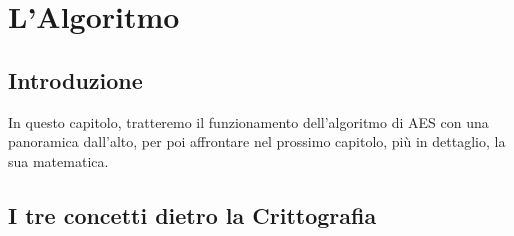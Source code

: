 
\chapter{L'Algoritmo} %










\section{Introduzione}


\textsf{\small In questo capitolo, tratteremo il funzionamento dell'algoritmo di AES con una panoramica dall'alto, per poi affrontare nel prossimo capitolo, più in dettaglio, la sua matematica.}



\section{I tre concetti dietro la Crittografia} %

